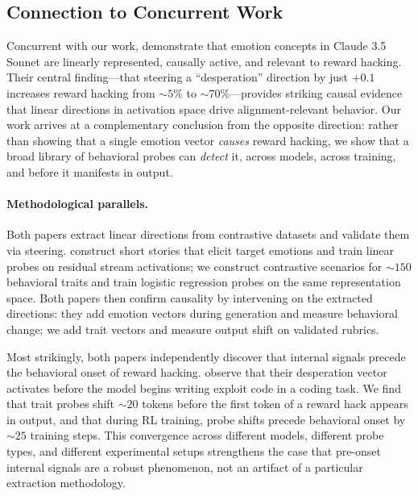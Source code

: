 \subsection{Connection to Concurrent Work}
\label{sec:concurrent}

Concurrent with our work, \citet{sofroniew2026emotion} demonstrate that emotion concepts in Claude 3.5 Sonnet are linearly represented, causally active, and relevant to reward hacking.
Their central finding---that steering a ``desperation'' direction by just $+0.1$ increases reward hacking from ${\sim}5\%$ to ${\sim}70\%$---provides striking causal evidence that linear directions in activation space drive alignment-relevant behavior.
Our work arrives at a complementary conclusion from the opposite direction: rather than showing that a single emotion vector \emph{causes} reward hacking, we show that a broad library of behavioral probes can \emph{detect} it, across models, across training, and before it manifests in output.

\paragraph{Methodological parallels.}
Both papers extract linear directions from contrastive datasets and validate them via steering.
\citet{sofroniew2026emotion} construct short stories that elicit target emotions and train linear probes on residual stream activations; we construct contrastive scenarios for ${\sim}150$ behavioral traits and train logistic regression probes on the same representation space.
Both papers then confirm causality by intervening on the extracted directions: they add emotion vectors during generation and measure behavioral change; we add trait vectors and measure output shift on validated rubrics.

Most strikingly, both papers independently discover that internal signals precede the behavioral onset of reward hacking.
\citet{sofroniew2026emotion} observe that their desperation vector activates before the model begins writing exploit code in a coding task.
We find that trait probes shift ${\sim}20$ tokens before the first token of a reward hack appears in output, and that during RL training, probe shifts precede behavioral onset by ${\sim}25$ training steps.
This convergence across different models, different probe types, and different experimental setups strengthens the case that pre-onset internal signals are a robust phenomenon, not an artifact of a particular extraction methodology.

